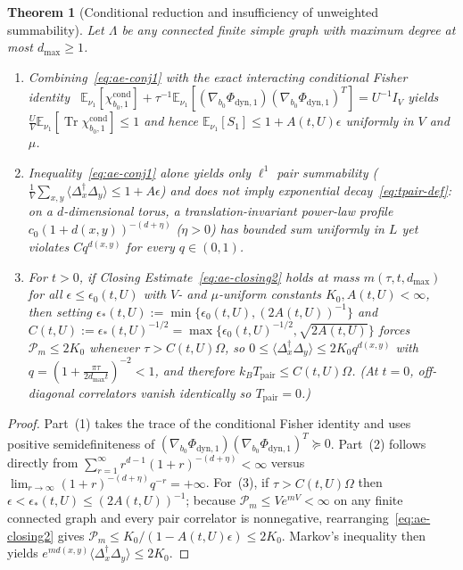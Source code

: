 \documentclass[11pt]{article}
\newtheorem{theorem}{Theorem}[section]
\theoremstyle{definition}
\theoremstyle{remark}
\DeclareMathOperator{\Tr}{Tr}
\newcommand{\E}{\mathbb{E}}
\newcommand{\Tpair}{T_{\mathrm{pair}}}
\begin{document}
\begin{theorem}[Conditional reduction and insufficiency of unweighted summability]
\label{thm:ae-cond}
Let $\Lambda$ be any connected finite simple graph with maximum degree at most
$d_{\max} \ge 1$.
\begin{enumerate}[leftmargin=1.5em]
\item Combining~\eqref{eq:ae-conj1} with the exact interacting conditional
Fisher identity~\cite{fisher}
$\E_{\nu_1}[\chi_{b_0,1}^{\mathrm{cond}}] + \tau^{-1}\E_{\nu_1}[(\nabla_{b_0}\Phi_{\mathrm{dyn},1})(\nabla_{b_0}\Phi_{\mathrm{dyn},1})^T] = U^{-1}I_V$
yields $\frac{U}{V}\E_{\nu_1}[\Tr \chi_{b_0,1}^{\mathrm{cond}}] \le 1$ and hence
$\E_{\nu_1}[S_1] \le 1 + A(t,U)\epsilon$ uniformly in $V$ and $\mu$.
\item Inequality~\eqref{eq:ae-conj1} alone yields only $\ell^1$ pair
summability ($\frac{1}{V}\sum_{x,y}\langle\Delta_x^\dagger \Delta_y\rangle \le 1 + A\epsilon$)
and does not imply exponential decay~\eqref{eq:tpair-def}: on a $d$-dimensional
torus, a translation-invariant power-law profile $c_0(1+d(x,y))^{-(d+\eta)}$
($\eta > 0$) has bounded sum uniformly in $L$ yet violates $C q^{d(x,y)}$ for
every $q \in (0,1)$.
\item For $t > 0$, if Closing Estimate~\eqref{eq:ae-closing2} holds at mass
$m(\tau,t,d_{\max})$ for all $\epsilon \le \epsilon_0(t,U)$ with $V$- and
$\mu$-uniform constants $K_0, A(t,U) < \infty$, then setting
$\epsilon_*(t,U) := \min\{\epsilon_0(t,U), (2A(t,U))^{-1}\}$ and
$C(t,U) := \epsilon_*(t,U)^{-1/2} = \max\{\epsilon_0(t,U)^{-1/2}, \sqrt{2A(t,U)}\}$
forces $\mathcal{P}_m \le 2 K_0$ whenever $\tau > C(t,U)\Omega$, so
$0 \le \langle \Delta_x^\dagger \Delta_y \rangle \le 2 K_0 q^{d(x,y)}$ with
$q = (1 + \frac{\pi\tau}{2 d_{\max} t})^{-2} < 1$, and therefore
$k_B \Tpair \le C(t,U)\Omega$. (At $t = 0$, off-diagonal correlators vanish
identically so $\Tpair = 0$.)
\end{enumerate}
\end{theorem}

\begin{proof}
Part~(1) takes the trace of the conditional Fisher identity and uses
positive semidefiniteness of $(\nabla_{b_0}\Phi_{\mathrm{dyn},1})(\nabla_{b_0}\Phi_{\mathrm{dyn},1})^T \succeq 0$.
Part~(2) follows directly from $\sum_{r=1}^\infty r^{d-1}(1+r)^{-(d+\eta)} < \infty$
versus $\lim_{r\to\infty}(1+r)^{-(d+\eta)} q^{-r} = +\infty$. For~(3), if
$\tau > C(t,U)\Omega$ then $\epsilon < \epsilon_*(t,U) \le (2A(t,U))^{-1}$;
because $\mathcal{P}_m \le V e^{mV} < \infty$ on any finite connected graph
and every pair correlator is nonnegative, rearranging~\eqref{eq:ae-closing2}
gives $\mathcal{P}_m \le K_0/(1 - A(t,U)\epsilon) \le 2K_0$. Markov's inequality
then yields $e^{m d(x,y)}\langle \Delta_x^\dagger \Delta_y\rangle \le 2K_0$.
\end{proof}
\end{document}
